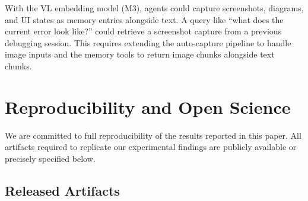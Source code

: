 \documentclass[11pt]{article}
\begin{document}
With the VL embedding model (M3), agents could capture screenshots, diagrams, and UI
states as memory entries alongside text. A query like ``what does the current error look
like?'' could retrieve a screenshot capture from a previous debugging session. This
requires extending the auto-capture pipeline to handle image inputs and the memory tools
to return image chunks alongside text chunks.

\section{Reproducibility and Open Science}
\label{sec:reproducibility}

We are committed to full reproducibility of the results reported in this paper.
All artifacts required to replicate our experimental findings are publicly available
or precisely specified below.

\subsection{Released Artifacts}
\end{document}
